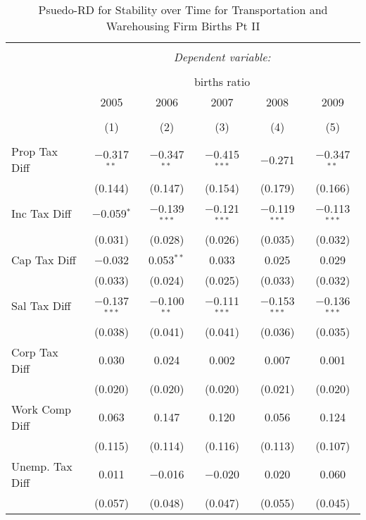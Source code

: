 
\begin{table}[!htbp] \centering 
  \caption{Psuedo-RD for Stability over Time for  Transportation and Warehousing Firm Births Pt II} 
  \label{48-49year} 
\small 
\begin{tabular}{@{\extracolsep{5pt}}lccccc} 
\\[-1.8ex]\hline 
\hline \\[-1.8ex] 
 & \multicolumn{5}{c}{\textit{Dependent variable:}} \\ 
\cline{2-6} 
\\[-1.8ex] & \multicolumn{5}{c}{births ratio} \\ 
 & 2005 & 2006 & 2007 & 2008 & 2009 \\ 
\\[-1.8ex] & (1) & (2) & (3) & (4) & (5)\\ 
\hline \\[-1.8ex] 
 Prop Tax Diff & $-$0.317$^{**}$ & $-$0.347$^{**}$ & $-$0.415$^{***}$ & $-$0.271 & $-$0.347$^{**}$ \\ 
  & (0.144) & (0.147) & (0.154) & (0.179) & (0.166) \\ 
  Inc Tax Diff & $-$0.059$^{*}$ & $-$0.139$^{***}$ & $-$0.121$^{***}$ & $-$0.119$^{***}$ & $-$0.113$^{***}$ \\ 
  & (0.031) & (0.028) & (0.026) & (0.035) & (0.032) \\ 
  Cap Tax Diff & $-$0.032 & 0.053$^{**}$ & 0.033 & 0.025 & 0.029 \\ 
  & (0.033) & (0.024) & (0.025) & (0.033) & (0.032) \\ 
  Sal Tax Diff & $-$0.137$^{***}$ & $-$0.100$^{**}$ & $-$0.111$^{***}$ & $-$0.153$^{***}$ & $-$0.136$^{***}$ \\ 
  & (0.038) & (0.041) & (0.041) & (0.036) & (0.035) \\ 
  Corp Tax Diff & 0.030 & 0.024 & 0.002 & 0.007 & 0.001 \\ 
  & (0.020) & (0.020) & (0.020) & (0.021) & (0.020) \\ 
  Work Comp Diff & 0.063 & 0.147 & 0.120 & 0.056 & 0.124 \\ 
  & (0.115) & (0.114) & (0.116) & (0.113) & (0.107) \\ 
  Unemp. Tax Diff & 0.011 & $-$0.016 & $-$0.020 & 0.020 & 0.060 \\ 
  & (0.057) & (0.048) & (0.047) & (0.055) & (0.045) \\ 

\end{tabular}
\end{table}
